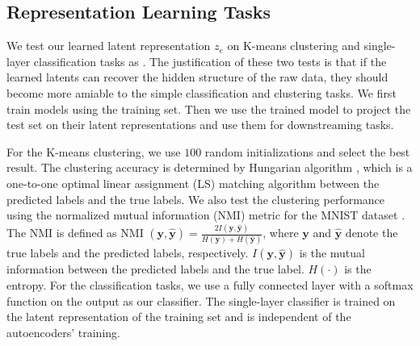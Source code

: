 \documentclass[letterpaper]{article} %
\begin{document}
 \subsection{Representation Learning Tasks}
 \label{sb: downstreamtasks}
 We test our learned latent representation $z_e$ on K-means clustering and single-layer classification tasks as \cite{DBLP:journals/corr/abs-1807-07543}. The justification of these two tests is that if the learned latents can recover the hidden structure of the raw data, they should become more amiable to the simple classification and clustering tasks. We first train models using the training set. Then we use the trained model to project the test set on their latent representations and use them for downstreaming tasks. 
 
 For the K-means clustering, we use $100$ random initializations and select the best result. The clustering accuracy is determined by Hungarian algorithm \cite{xie:16:icml}, which is a one-to-one optimal linear assignment (LS) matching algorithm between the predicted labels and the true labels. We also test the clustering performance using the normalized mutual information (NMI) metric for the MNIST dataset \cite{Somvae} \cite{DBLP:journals/corr/abs-1801-07648}. The NMI is defined as NMI $(\mathbf{y}, \hat{\mathbf{y}}) = \frac{2I(\mathbf{y}, \hat{\mathbf{y}})}{H(\mathbf{y}) + H(\hat{\mathbf{y}})}$, where $\mathbf{y}$ and $\hat{\mathbf{y}}$ denote the true labels and the predicted labels, respectively. $I(\mathbf{y}, \hat{\mathbf{y}})$ is the mutual information between the predicted labels and the true label. $H(\cdot)$ is the entropy. For the classification tasks, we use a fully connected layer with a softmax function on the output as our classifier. The single-layer classifier is trained on the latent representation of the training set and is independent of the autoencoders' training.
\begin{table}[!ht]
	\caption{Accuracy of downstream tasks of MNIST.}
	\centering
	\label{MNIST_table}
\end{table}
\end{document}
